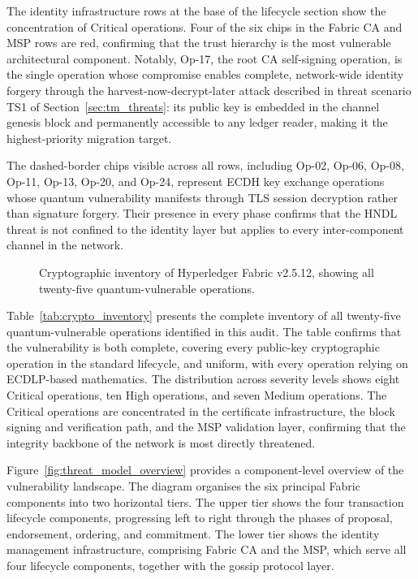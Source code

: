 \documentclass[conference]{IEEEtran}
\begin{document}
The identity infrastructure rows at the base of the lifecycle section
show the concentration of Critical operations. Four of the six chips in
the Fabric CA and MSP rows are red, confirming that the trust hierarchy
is the most vulnerable architectural component. Notably, Op-17, the root
CA self-signing operation, is the single operation whose compromise
enables complete, network-wide identity forgery through the
harvest-now-decrypt-later attack described in threat scenario TS1 of
Section~\ref{sec:tm_threats}: its public key is embedded in the channel
genesis block and permanently accessible to any ledger reader, making
it the highest-priority migration target.

The dashed-border chips visible across all rows, including Op-02, Op-06,
Op-08, Op-11, Op-13, Op-20, and Op-24, represent ECDH key exchange
operations whose quantum vulnerability manifests through TLS session
decryption rather than signature forgery. Their presence in every phase
confirms that the HNDL threat is not confined to the identity layer but
applies to every inter-component channel in the network.

\begin{figure}[ht]
\centering

\caption{Cryptographic inventory of Hyperledger Fabric v2.5.12, showing all twenty-five quantum-vulnerable operations.}
\label{fig:crypto_inventory}
\end{figure}

Table~\ref{tab:crypto_inventory} presents the complete inventory of all
twenty-five quantum-vulnerable operations identified in this audit. The
table confirms that the vulnerability is both complete, covering every
public-key cryptographic operation in the standard lifecycle, and
uniform, with every operation relying on ECDLP-based mathematics. The
distribution across severity levels shows eight Critical operations,
ten High operations, and seven Medium operations. The Critical operations
are concentrated in the certificate infrastructure, the block signing
and verification path, and the MSP validation layer, confirming that the
integrity backbone of the network is most directly threatened.

Figure~\ref{fig:threat_model_overview} provides a component-level
overview of the vulnerability landscape. The diagram organises the six
principal Fabric components into two horizontal tiers. The upper tier
shows the four transaction lifecycle components, progressing left to
right through the phases of proposal, endorsement, ordering, and
commitment. The lower tier shows the identity management infrastructure,
comprising Fabric CA and the MSP, which serve all four lifecycle
components, together with the gossip protocol layer.
\end{document}
